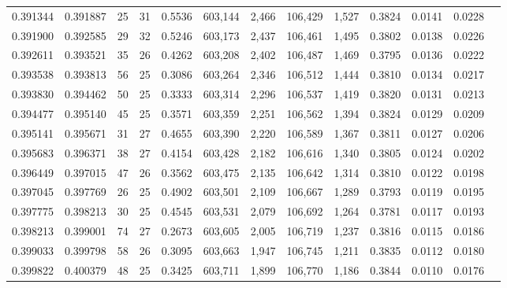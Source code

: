 \begin{tabular}{rrrrrrrrrrrrr}
0.391344 & 0.391887 &  25 &  31 &                                     0.5536 & 603,144 &   2,466 & 106,429 &   1,527 & 0.3824 & 0.0141 & 0.0228 \\
0.391900 & 0.392585 &  29 &  32 &                                     0.5246 & 603,173 &   2,437 & 106,461 &   1,495 & 0.3802 & 0.0138 & 0.0226 \\
0.392611 & 0.393521 &  35 &  26 &                                     0.4262 & 603,208 &   2,402 & 106,487 &   1,469 & 0.3795 & 0.0136 & 0.0222 \\
0.393538 & 0.393813 &  56 &  25 &                                     0.3086 & 603,264 &   2,346 & 106,512 &   1,444 & 0.3810 & 0.0134 & 0.0217 \\
0.393830 & 0.394462 &  50 &  25 &                                     0.3333 & 603,314 &   2,296 & 106,537 &   1,419 & 0.3820 & 0.0131 & 0.0213 \\
0.394477 & 0.395140 &  45 &  25 &                                     0.3571 & 603,359 &   2,251 & 106,562 &   1,394 & 0.3824 & 0.0129 & 0.0209 \\
0.395141 & 0.395671 &  31 &  27 &                                     0.4655 & 603,390 &   2,220 & 106,589 &   1,367 & 0.3811 & 0.0127 & 0.0206 \\
0.395683 & 0.396371 &  38 &  27 &                                     0.4154 & 603,428 &   2,182 & 106,616 &   1,340 & 0.3805 & 0.0124 & 0.0202 \\
0.396449 & 0.397015 &  47 &  26 &                                     0.3562 & 603,475 &   2,135 & 106,642 &   1,314 & 0.3810 & 0.0122 & 0.0198 \\
0.397045 & 0.397769 &  26 &  25 &                                     0.4902 & 603,501 &   2,109 & 106,667 &   1,289 & 0.3793 & 0.0119 & 0.0195 \\
0.397775 & 0.398213 &  30 &  25 &                                     0.4545 & 603,531 &   2,079 & 106,692 &   1,264 & 0.3781 & 0.0117 & 0.0193 \\
0.398213 & 0.399001 &  74 &  27 &                                     0.2673 & 603,605 &   2,005 & 106,719 &   1,237 & 0.3816 & 0.0115 & 0.0186 \\
0.399033 & 0.399798 &  58 &  26 &                                     0.3095 & 603,663 &   1,947 & 106,745 &   1,211 & 0.3835 & 0.0112 & 0.0180 \\
0.399822 & 0.400379 &  48 &  25 &                                     0.3425 & 603,711 &   1,899 & 106,770 &   1,186 & 0.3844 & 0.0110 & 0.0176 \\

\end{tabular}
